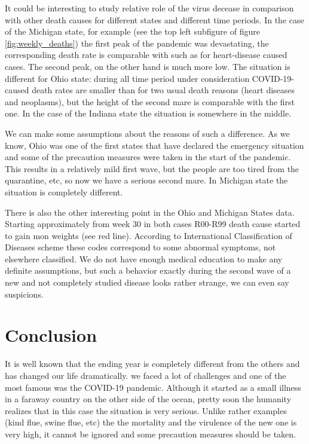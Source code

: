 \documentclass[conference]{IEEEtran}
\begin{document}
It could be interesting to study relative role of the virus decease in comparison with other death causes for different states and different time periods. In the case of the Michigan state, for example (see the top left subfigure of figure \ref{fig:weekly_deaths}) the first peak of the pandemic was devastating, the corresponding death rate is comparable  with such as for heart-disease caused cases. The second peak, on the other hand is much more low. The situation is different for Ohio state: during all time period under consideration COVID-19-caused death rates are smaller than for two usual death reasons (heart diseases and neoplasms), but the height of the second mare is comparable with the first one. In the case of the Indiana state the situation is somewhere in the middle.

We can make some assumptions about the reasons of such a difference. As we know, Ohio was one of the first states that have declared the emergency situation and some of the precaution measures were taken in the start of the pandemic. This results in a relatively mild first wave, but the people are too tired from the quarantine, etc, so now we have a serious second mare. In Michigan state the situation is completely different.

There is also the other interesting point in the Ohio and Michigan States data. Starting approximately from week 30 in both cases R00-R99 death cause started to gain mon weights (see red line). According to  International Classification of Diseases scheme  \cite{cdc_international_nodate} these codes correspond to some abnormal symptoms, not elsewhere classified. We do not have enough medical education to make any definite assumptions, but such a behavior exactly during the second wave of a new and not completely studied disease looks rather strange, we can even say suspicions.




\section{Conclusion}

It is well known that the ending year is completely different from the others and has changed our life dramatically. we faced a lot of challenges and one of the most famous was the COVID-19 pandemic. Although it started as a small illness in a faraway country on the other side of the ocean, pretty soon the humanity realizes that in this case the situation is very serious. Unlike rather examples (kind flue, swine flue, etc) the the mortality and the virulence of the new one is very high, it cannot be ignored and some precaution measures should be taken.
\end{document}

